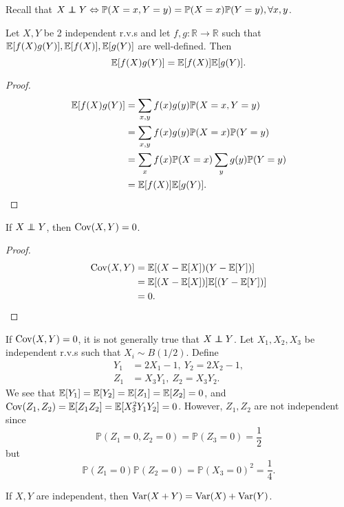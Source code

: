 Recall that $ X\independent Y \Leftrightarrow \mathbb{P}(X=x,Y=y)=\mathbb{P}(X=x)\mathbb{P}(Y=y), \forall x,y $.

\begin{proposition}
    Let $X,Y$ be 2 independent r.v.s and let $ f,g:\mathbb{R} \to \mathbb{R} $ such that $ {\mathbb{E}}[f(X)g(Y)],{\mathbb{E}}[f(X)],{\mathbb{E}}[g(Y)] $ are well-defined. Then
    \[
        {\mathbb{E}}[f(X)g(Y)] = {\mathbb{E}}[f(X)]{\mathbb{E}}[g(Y)].
    \]
\end{proposition}
\begin{proof}
    \begin{align*}
        {\mathbb{E}}[f(X)g(Y)]&= \sum_{x,y} f(x)g(y) \mathbb{P}(X=x,Y=y)\\ 
        &= \sum_{x,y} f(x)g(y) \mathbb{P}(X=x)\mathbb{P}(Y=y)\\ 
        &= \sum_{x} f(x)\mathbb{P}(X=x) \sum_y g(y)\mathbb{P}(Y=y)\\ 
        &= {\mathbb{E}}[f(X)]{\mathbb{E}}[g(Y)].\qedhere
    \end{align*}
\end{proof}

\begin{proposition}
    If $ X \independent Y $, then $ \operatorname{Cov}(X,Y)=0 $.
\end{proposition}
\begin{proof}
    \begin{align*}
        \operatorname{Cov}(X,Y) &= {\mathbb{E}}[(X-{\mathbb{E}}[X])(Y-{\mathbb{E}}[Y])] \\
        &= {\mathbb{E}}[(X-{\mathbb{E}}[X])]{\mathbb{E}}[(Y-{\mathbb{E}}[Y])]\\ 
        &= 0.\qedhere
    \end{align*}
\end{proof}
\begin{note}
    If $ \operatorname{Cov}(X,Y)=0 $, it is not generally true that $ X \independent Y $. Let $ X_1,X_2,X_3 $ be independent r.v.s such that $ X_i\sim B(1/2) $. Define 
    \[
        \begin{aligned}
            Y_1 &= 2X_1-1,\  Y_2 = 2X_2-1,\\ 
            Z_1&=X_3Y_1,\ Z_2 =X_3Y_2.
        \end{aligned}
    \]
    We see that $ {\mathbb{E}}[Y_1]={\mathbb{E}}[Y_2]={\mathbb{E}}[Z_1]={\mathbb{E}}[Z_2]=0 $, and $ \operatorname{Cov}(Z_1,Z_2) = {\mathbb{E}}[Z_1Z_2] = {\mathbb{E}}[X_3^2Y_1Y_2]=0 $. However, $ Z_1,Z_2 $ are not independent since 
    \[
        \mathbb{P}(Z_1=0,Z_2=0) = \mathbb{P}(Z_3=0) = \frac{1}{2}
    \]
    but 
    \[
        \mathbb{P}(Z_1=0)\mathbb{P}(Z_2=0) = \mathbb{P}(X_3=0)^2=\frac{1}{4}.
    \]
\end{note}
\begin{corollary}
    If $ X,Y $ are independent, then $ \operatorname{Var}(X+Y) = \operatorname{Var}(X)+\operatorname{Var}(Y) $.
\end{corollary}

